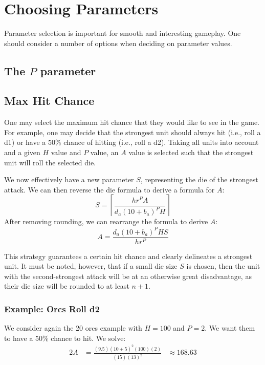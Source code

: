 \documentclass{article}
\begin{document}
\section{Choosing Parameters}\label{sec:params}

Parameter selection is important for smooth and interesting gameplay.
One should consider a number of options when deciding on parameter values.

\subsection{The $P$ parameter}


\subsection{Max Hit Chance}

One may select the maximum hit chance that they would like to see in the game.
For example, one may decide that the strongest unit should always hit (i.e., roll a d1)
or have a 50\% chance of hitting (i.e., roll a d2).
Taking all units into account and a given $H$ value and $P$ value,
an $A$ value is selected such that the strongest unit will roll the selected die.

We now effectively have a new parameter $S$, representing the die of the strongest attack.
We can then reverse the die formula to derive a formula for $A$:
\[
    S =
        \left\lceil
            \frac
                {h r^P A}
                {d_a (10 + b_{a})^P H}
        \right\rceil
\]
After removing rounding, we can rearrange the formula to derive $A$:
\[
    A = 
        \frac
            {d_a (10 + b_{a})^P H S}
            {h r^P}
\]

This strategy guarantees a certain hit chance and clearly delineates a strongest unit.
It must be noted, however, that if a small die size $S$ is chosen,
then the unit with the second-strongest attack will be at an otherwise great disadvantage,
as their die size will be rounded to at least $n + 1$.


\subsubsection{Example: Orcs Roll d2}

We consider again the 20 orcs example with $H = 100$ and $P = 2$.
We want them to have a 50\% chance to hit.
We solve:
\begin{alignat*}{2}
    A &= 
        \frac
            {(9.5) (10 + 5)^2 (100) (2)}
            {(15) (13)^2}
        &{}\approx{} 168.63
\end{alignat*}
\end{document}

